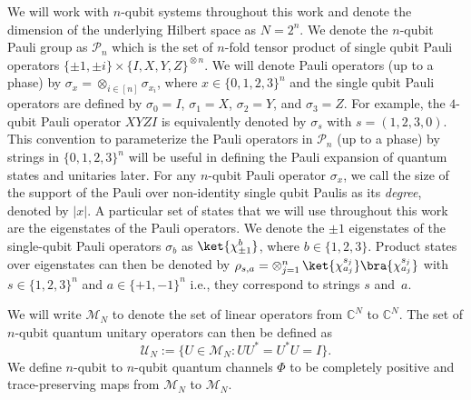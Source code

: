 \documentclass[11pt]{article}
\newcommand{\calP}{\mathcal{P}}
\theoremstyle{plain}
\theoremstyle{plain}
\theoremstyle{definition}
\theoremstyle{remark}
\theoremstyle{named}
\begin{document}
We will work with $n$-qubit systems throughout this work and denote the dimension of the underlying Hilbert space as $N=2^n$. We denote the $n$-qubit Pauli group as $\mathcal{P}_n$ which is the set of $n$-fold tensor product of single qubit Pauli operators $\{\pm 1, \pm i\} \times \{I,X,Y,Z\}^{\mathop{\otimes} n}$. We will denote Pauli operators (up to a phase) by $\sigma_x=\otimes_{i\in [n]}\sigma_{x_i}$, where $x \in \{0,1,2,3\}^n$ and the single qubit Pauli operators are defined by $\sigma_0 = I$, $\sigma_1 = X$, $\sigma_2 = Y$, and $\sigma_3=Z$. For example, the $4$-qubit Pauli operator $XYZI$ is equivalently denoted by $\sigma_s$ with $s=(1,2,3,0)$. This convention to parameterize the Pauli operators in $\calP_n$ (up to a phase) by strings in $\{0,1,2,3\}^n$ will be useful in defining the Pauli expansion of quantum states and unitaries later. For any $n$-qubit Pauli operator $\sigma_x$, we call the size of the support of the Pauli over non-identity single qubit Paulis as its \textit{degree}, denoted by $|x|$. A particular set of states that we will use throughout this work are the eigenstates of the Pauli operators. We denote the $\pm 1$ eigenstates of the single-qubit Pauli operators $\sigma_b$ as $\ket{\chi_{\pm 1}^b}$, where $b \in \{1,2,3\}$. Product states over eigenstates can then be denoted by $\rho_{s,a} = \mathop{\otimes}_{j=1}^n \ket{\chi_{a_j}^{s_j}}\bra{\chi_{a_j}^{s_j}}$ with $s \in \{1,2,3\}^n$ and $a \in \{+1,-1\}^n$ i.e., they correspond to strings $s$ and~$a$.


We will write $\mathcal{M}_{N}$ to denote the set of linear operators from $\mathbb{C}^N$ to $\mathbb{C}^N$. The set of $n$-qubit quantum unitary operators can then be defined as
\begin{equation}
    \mathcal{U}_N := \{U \in \mathcal{M}_{N} : UU^* = U^* U = I\}.
\end{equation}
We define $n$-qubit to $n$-qubit quantum channels $\Phi$ to be completely positive and trace-preserving maps from $\mathcal{M}_{N}$ to $
\mathcal{M}_{N}$.
\end{document}

